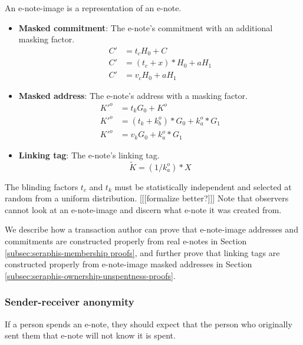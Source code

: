 An e-note-image is a representation of an e-note.

\begin{itemize}
    \item \textbf{Masked commitment}: The e-note's commitment with an additional masking factor.\vspace{.115cm}
    \begin{align*}
        C' &= t_c H_0 + C \\
        C' &= (t_c + x)*H_0 + a H_1 \\
        C' &= v_c H_0 + a H_1
    \end{align*}

    \item \textbf{Masked address}: The e-note's address with a masking factor.\vspace{.115cm}
    \begin{align*}
        K'^o &= t_k G_0 + K^o \\
        K'^o &= (t_k + k^o_b)*G_0 + k^o_a*G_1 \\
        K'^o &= v_k G_0 + k^o_a*G_1
    \end{align*}

    \item \textbf{Linking tag}: The e-note's linking tag.\vspace{.115cm}
    \[\tilde{K} = (1/k^o_a)*X\]
\end{itemize}

The blinding factors $t_c$ and $t_k$ must be statistically independent and selected at random from a uniform distribution. [[[formalize better?]]] Note that observers cannot look at an e-note-image and discern what e-note it was created from.

We describe how a transaction author can prove that e-note-image addresses and commitments are constructed properly from real e-notes in Section \ref{subsec:seraphis-membership proofs}, and further prove that linking tags are constructed properly from e-note-image masked addresses in Section \ref{subsec:seraphis-ownership-unspentness-proofs}.

\subsubsection{Sender-receiver anonymity}
\label{subsubsec:e-note-images-sender-receiver-anonymity}

If a person spends an e-note, they should expect that the person who originally sent them that e-note will not know it is spent.

